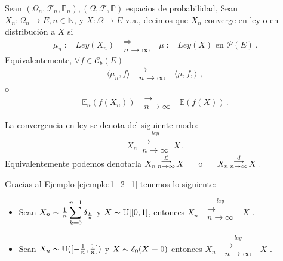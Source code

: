 \begin{definition}
Sean $(\Omega_n,\mathcal{F}_n,\mathbb{P}_n), (\Omega,\mathcal{F},\mathbb{P})$ espacios de probabilidad, Sean $X_n:\Omega_n \longrightarrow E, n\in\mathbb{N}$, y $X:\Omega \longrightarrow E$ v.a., decimos que $X_n$ converge en ley o en distribución a $X$ si 
$$\mu_n:=Ley(X_n) \mbox{ }\substack{\Longrightarrow \\n \to \infty}\mbox{ } \mu:=Ley(X)\mbox{ en }\mathcal{P}(E) \, .$$
Equivalentemente, $\forall f \in \mathcal{C}_b(E)$ $$ \langle \mu_n,f \rangle \mbox{ }\substack{\longrightarrow \\ n\to\infty}\mbox{ } \langle \mu,f,\rangle\, \, ,$$
o
$$ \mathbb{E}_n(f(X_n)) \mbox{ }\substack{\longrightarrow \\ n\to\infty}\mbox{ } \mathbb{E}(f(X))\, .$$
\end{definition}
\begin{notation}
La convergencia en ley se denota del siguiente modo:
$$X_n \,\overset{ley}{\substack{\longrightarrow \\n \to \infty}}\,X \, .$$
Equivalentemente podemos denotarla \espacio
$ X_n \,\overset{\mathcal{L}}{\substack{\longrightarrow \\n \to \infty}}\,X \hspace{.5cm}\mbox{ o }\hspace{.5cm} X_n\,\overset{d}{\substack{\longrightarrow \\n \to \infty}}\,X \, .$
\end{notation}

\begin{example}
Gracias al Ejemplo \ref{ejemplo:1_2_1} tenemos lo siguiente:
\begin{itemize}
    \item Sean $X_n \thicksim \frac{1}{n}\displaystyle\sum_{k=0}^{n-1}\delta_{\frac{k}{n}}$ y $X \thicksim \mathbb{U}[[0,1]$, entonces $X_n \mbox{ }\overset{ley}{\substack{\longrightarrow \\n \to \infty}}\mbox{ }X$ .
    \item Sean $X_n \thicksim \mathbb{U}([-\frac{1}{n},\frac{1}{n}])$ y $X \thicksim \delta_0 (X \equiv 0)$ entonces $X_n\mbox{ }\overset{ley}{\substack{\longrightarrow \\n \to \infty}}\mbox{ }X$ .
\end{itemize}
\end{example}

